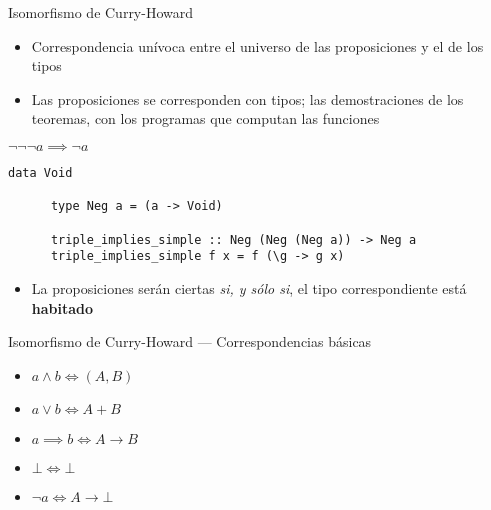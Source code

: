 \documentclass[10pt]{beamer}
\begin{document}
\begin{frame}[fragile]{Isomorfismo de Curry-Howard}

  \begin{itemize}
  \item Correspondencia unívoca entre el universo de las proposiciones
    y el de los tipos
  \item Las proposiciones se corresponden con tipos; las
    demostraciones de los teoremas, con los programas que computan las
    funciones
  \end{itemize}
  \begin{minipage}{0.3\textwidth}
    \begin{center}
      $\neg \neg \neg a \implies \neg a$
    \end{center}
  \end{minipage}
  \begin{minipage}{0.65\textwidth}
    \begin{center}
      \begin{lstlisting}[basicstyle=\tiny]
      data Void

      type Neg a = (a -> Void)

      triple_implies_simple :: Neg (Neg (Neg a)) -> Neg a
      triple_implies_simple f x = f (\g -> g x)
      \end{lstlisting}
    \end{center}
  \end{minipage}
  \begin{itemize}
  \item La proposiciones serán ciertas \textit{si, y sólo si}, el tipo
    correspondiente está \textbf{habitado}
  \end{itemize}

\end{frame}

\begin{frame}[fragile]{Isomorfismo de Curry-Howard --- Correspondencias básicas}

  \begin{itemize}
  \item $a \land b \iff (A, B)$
  \item $a \lor b \iff A + B$
  \item $a \implies b \iff A \rightarrow B$
  \item $\bot \iff \bot$
  \item $\neg a \iff A \rightarrow \bot$
  \end{itemize}

\end{frame}
\end{document}

